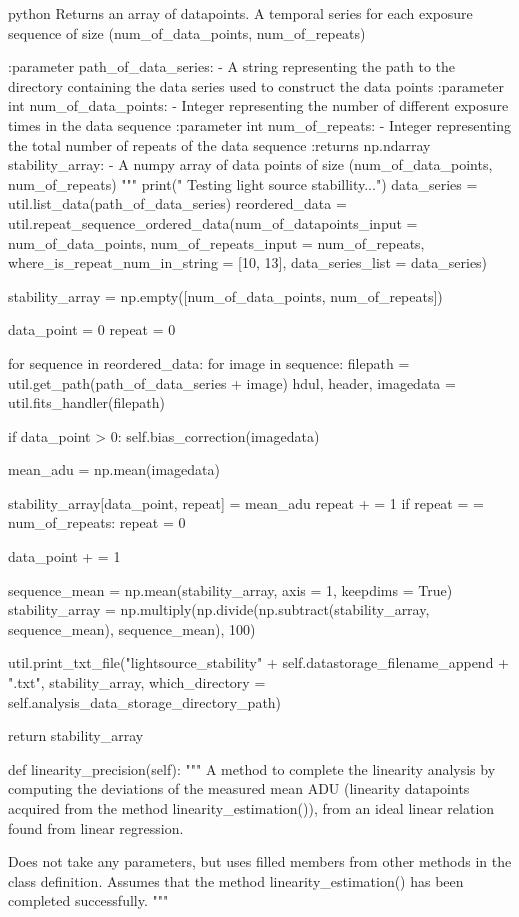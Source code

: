 \documentclass[../main.tex]{subfiles}
\begin{document}
\begin{mintedbox}{python}
Returns an array of datapoints. A temporal series for each exposure sequence
of size (num_of_data_points, num_of_repeats)

:parameter path_of_data_series:
- A string representing the path to the directory
containing the data series used to construct the data points
:parameter int num_of_data_points:
- Integer representing the number of different exposure times
in the data sequence
:parameter int num_of_repeats:
- Integer representing the total number of repeats of the data sequence
:returns np.ndarray stability_array:
- A numpy array of data points of size (num_of_data_points, num_of_repeats)
"""
print(" Testing light source stabillity...")
data_series  =  util.list_data(path_of_data_series)
reordered_data  =  util.repeat_sequence_ordered_data(num_of_datapoints_input = num_of_data_points,
num_of_repeats_input = num_of_repeats,
where_is_repeat_num_in_string = [10, 13],
data_series_list = data_series)

stability_array  =  np.empty([num_of_data_points, num_of_repeats])

data_point  =  0
repeat  =  0

for sequence in reordered_data:
for image in sequence:
filepath  =  util.get_path(path_of_data_series + image)
hdul, header, imagedata  =  util.fits_handler(filepath)

if data_point > 0:
self.bias_correction(imagedata)

mean_adu  =  np.mean(imagedata)

stability_array[data_point, repeat]  =  mean_adu
repeat + =  1
if repeat  =  =  num_of_repeats:
repeat  =  0

data_point + =  1

sequence_mean  =  np.mean(stability_array, axis = 1, keepdims = True)
stability_array  =  np.multiply(np.divide(np.subtract(stability_array, sequence_mean), sequence_mean), 100)

util.print_txt_file("lightsource_stability" + self.datastorage_filename_append + ".txt", stability_array,
which_directory = self.analysis_data_storage_directory_path)

return stability_array

def linearity_precision(self):
"""
A method to complete the linearity analysis by computing the deviations
of the measured mean ADU (linearity datapoints acquired from the method
linearity_estimation()), from an ideal linear relation found from linear
regression.

Does not take any parameters, but uses filled members from other methods
in the class definition. Assumes that the method linearity_estimation()
has been completed successfully.
"""


\end{mintedbox}
\end{document}
